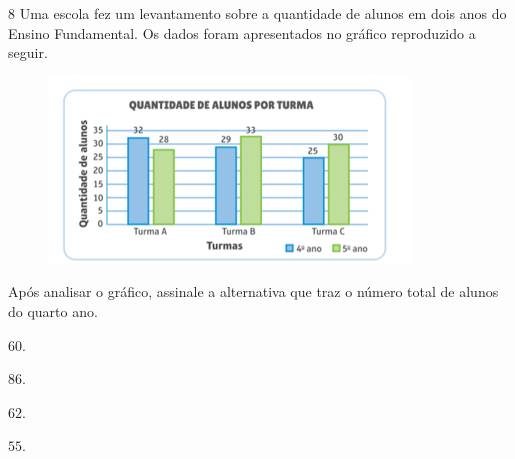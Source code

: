 

\pagebreak
\num{8} Uma escola fez um levantamento sobre a quantidade de alunos em dois
anos do Ensino Fundamental. Os dados foram apresentados no gráfico reproduzido
a seguir.

\begin{figure}[htpb!]
\centering\includegraphics[width=\textwidth]{./imgSAEB_6_MAT/media/image110.png}
\end{figure}

Após analisar o gráfico, assinale a alternativa que traz o
número total de alunos do quarto ano.

\begin{escolha}
\item $60$.
\item $86$.
\item $62$.
\item $55$.
\end{escolha}

